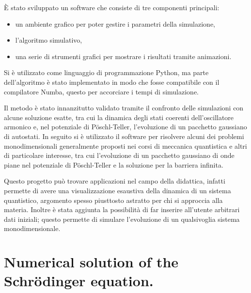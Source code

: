 \documentclass{article}
\begin{document}
È stato sviluppato un software che consiste di tre componenti principali: 
\begin{itemize} [nolistsep, leftmargin=1.5cm]
    \item un ambiente grafico per poter gestire i parametri della simulazione,
    \item l'algoritmo simulativo,
    \item una serie di strumenti grafici per mostrare i risultati tramite animazioni.
\end{itemize}
Si è utilizzato come linguaggio di programmazione Python, ma parte dell'algoritmo è stato implementato in modo che fosse compatibile con il compilatore Numba, questo per accorciare i tempi di simulazione. 

Il metodo è stato innanzitutto validato tramite il confronto delle simulazioni con alcune soluzione esatte, tra cui la dinamica degli stati coerenti dell'oscillatore armonico e, nel potenziale di P\"oschl-Teller, l'evoluzione di un pacchetto gaussiano di autostati. In seguito si è utilizzato il software per risolvere alcuni dei problemi monodimensionali generalmente proposti nei corsi di meccanica quantistica e altri di particolare interesse, tra cui l'evoluzione di un pacchetto gaussiano di onde piane nel potenziale di P\"oschl-Teller e la soluzione per la barriera infinita.  

Questo progetto può trovare applicazioni nel campo della didattica, infatti permette di avere una visualizzazione esaustiva della dinamica di un sistema quantistico, argomento spesso piusttosto astratto per chi si approccia alla materia. Inoltre è stata aggiunta la possibilità di far inserire all'utente arbitrari dati iniziali; questo permette di simulare l'evoluzione di un qualsivoglia sistema monodimensionale. 

\newpage
\section*{Numerical solution of the Schr\"odinger equation.}
\end{document}
